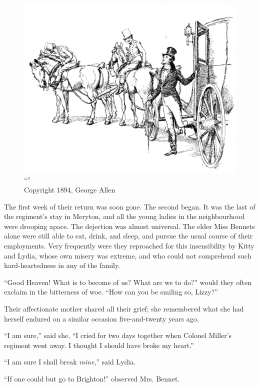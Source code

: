 \begin{figure}[htbp]
    \centering
    \includegraphics[width=\textwidth]{illustrations/i_031.jpg}
    \caption{“”\\ Copyright 1894, George Allen}
    \label{fig:image}
\end{figure}


The first week of their return was soon gone. The second began. It was the last of the regiment's stay in Meryton, and all the young ladies in the neighbourhood were drooping apace. The dejection was almost universal. The elder Miss Bennets alone were still able to eat, drink, and sleep, and pursue the usual course of their employments. Very frequently were they reproached for this insensibility by Kitty and Lydia, whose own misery was extreme, and who could not comprehend such hard-heartedness in any of the family.

``Good Heaven! What is to become of us? What are we to do?'' would they often exclaim in the bitterness of woe. ``How can you be smiling so, Lizzy?''

Their affectionate mother shared all their grief; she remembered what she had herself endured on a similar occasion five-and-twenty years ago.

``I am sure,'' said she, ``I cried for two days together when Colonel Miller's regiment went away. I thought I should have broke my heart.''

``I am sure I shall break \textit{mine},'' said Lydia.

``If one could but go to Brighton!'' observed Mrs. Bennet.

